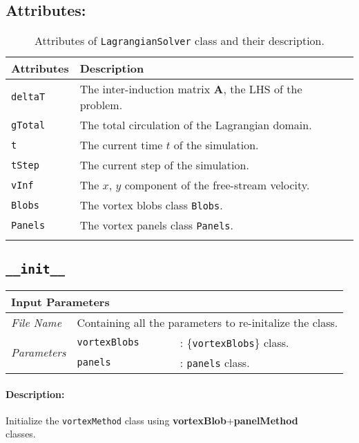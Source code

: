 \subsection*{Attributes:}
\begingroup
\footnotesize
\begin{longtable}{|l|p{12cm}|}
	\hline
	\textbf{Attributes} & \textbf{Description}\\
	\toprule
    \texttt{deltaT}     & The inter-induction matrix $\mathbf{A}$, the LHS of the problem. \\ \hline
    \texttt{gTotal}     & The total circulation of the Lagrangian domain. \\ \hline    
	\texttt{t} & The current time $t$ of the simulation.\\          \hline
	\texttt{tStep} & The current step of the simulation.\\          \hline
	\texttt{vInf} & The $x$, $y$ component of the free-stream velocity.\\          \hline	
	\texttt{Blobs} & The vortex blobs class \texttt{Blobs}.\\          \hline	
	\texttt{Panels} & The vortex panels class \texttt{Panels}.\\          \hline			
                      
    \caption{Attributes of \texttt{LagrangianSolver} class and their description.}
    \label{tab:attributesLagrangianSolver}
\end{longtable}
\endgroup


\subsection*{\texttt{\_\_init\_\_}}
	\begin{tabular}{l|lp{7cm}}
		\multicolumn{2}{l}{\textbf{Input Parameters}} & \\ \hline
		\textit{File Name} & \multicolumn{2}{l}{Containing all the parameters to re-initalize the class.} \\ \hline
		\multirow{2}{*}{\textit{Parameters}} & \texttt{vortexBlobs} &: \{\texttt{vortexBlobs}\} class. \\ \cline{2-3}
		& \texttt{panels} &: \texttt{panels} class. \\ \cline{2-3}
	\end{tabular}
	\paragraph{Description:} Initialize the \texttt{vortexMethod} class using \textbf{vortexBlob}+\textbf{panelMethod} \\ classes.
